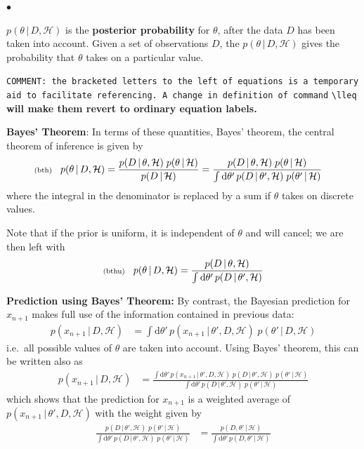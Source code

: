 \documentclass[11pt]{article}
\newcommand{\lleq}[1]{\label{#1} }
\renewcommand{\lleq}[1]{\label{#1} {\scriptstyle {\rm (#1)}} \hspace*{2ex} }
\newenvironment{mtemize}{
  \begin{list}{$\bullet$}
    {\setlength{\itemsep}{0pt}
     \setlength{\leftmargin}{3ex}
    }
  }
  {\end{list}}
\newcommand{\hmod}  {{\mathcal{H}}}  %
\newcommand{\cond}{\,|\,}
\newcommand{\rmdx}[1]{\mbox{d} #1 \,} %
\begin{document}
\begin{mtemize}
\item $p(\theta\cond D,\hmod)$ is the \textbf{posterior probability}
  for $\theta$, after the data $D$ has been taken into account. Given
  a set of observations $D$, the $p(\theta\cond D,\hmod)$ gives the
  probability that $\theta$ takes on a particular value.

\item \texttt{COMMENT: the bracketed letters to the left of equations
    is a temporary aid to facilitate referencing. A change in
    definition of command} \verb=\lleq= \textbf{will make them revert
    to ordinary equation labels.}

\item \textbf{Bayes' Theorem}: In terms of these quantities, Bayes'
  theorem, the central theorem of inference is given by
  \begin{align}
    \lleq{bth}
    p(\theta\cond D,\hmod)
    &= \frac{p(D\cond\theta,\hmod)\;p(\theta\cond\hmod)}
    {p(D\cond\hmod)}
    = \frac{p(D\cond\theta,\hmod)\;p(\theta\cond\hmod)}
    {\int \rmdx{\theta'} p(D\cond\theta',\hmod)\;p(\theta'\cond\hmod)}
  \end{align}
  where the integral in the denominator is replaced by a sum if
  $\theta$ takes on discrete values.

\item Note that if the prior is uniform, it is independent of $\theta$
  and will cancel; we are then left with
  \begin{equation}
    \lleq{bthu}
    p(\theta\cond D,\hmod)
    = \frac{p(D\cond\theta,\hmod)} {\int \rmdx{\theta'} p(D\cond\theta',\hmod)}
  \end{equation}

\item \textbf{Prediction using Bayes' Theorem:} By contrast, the
  Bayesian prediction for $x_{n+1}$ makes full use of the information
  contained in previous data:
  \begin{align}
    p(x_{n+1}\cond D,\hmod)
    &= \int \rmdx{\theta'} p(x_{n+1}\cond\theta',D,\hmod)\;p(\theta'\cond
    D,\hmod)
  \end{align}
  i.e.\ all possible values of $\theta$ are taken into account. Using
  Bayes' theorem, this can be written also as
  \begin{align}
    p(x_{n+1}\cond D,\hmod)
    &= \frac{\int \rmdx{\theta'} p(x_{n+1}\cond\theta',D,\hmod)\;
      p(D\cond\theta',\hmod)\;p(\theta'\cond\hmod)}
    {\int \rmdx{\theta'} p(D\cond\theta',\hmod)\;p(\theta'\cond\hmod)}
  \end{align}
  which shows that the prediction for $x_{n+1}$ is a weighted average
  of $p(x_{n+1}\cond\theta',D,\hmod)$ with the weight given by
  \begin{align}
  \frac{p(D\cond\theta',\hmod)\;p(\theta'\cond\hmod)}
  {\int \rmdx{\theta'} p(D\cond\theta',\hmod)\;p(\theta'\cond\hmod)}
  &=
  \frac{p(D,\theta'\cond\hmod)}
  {\int \rmdx{\theta'} p(D,\theta'\cond\hmod)}
  \end{align}
\end{mtemize}
\end{document}
